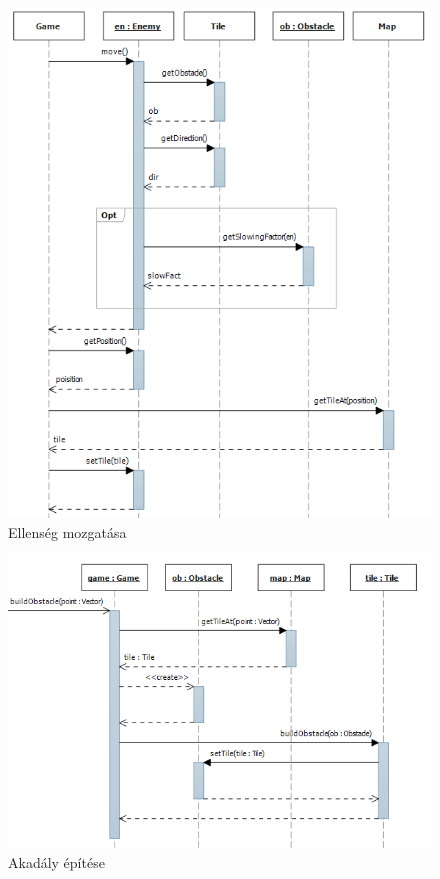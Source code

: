 \begin{figure}[H]
\begin{center}
\includegraphics[width=13cm]{images/moving_enemy.png}
\caption{Ellenség mozgatása}
\label{fig:moving_enemy}
\end{center}
\end{figure}

\begin{figure}[H]
\begin{center}
\includegraphics[width=15cm]{images/building_obstacle.png}
\caption{Akadály építése}
\label{fig:building_obstacle}
\end{center}
\end{figure}

